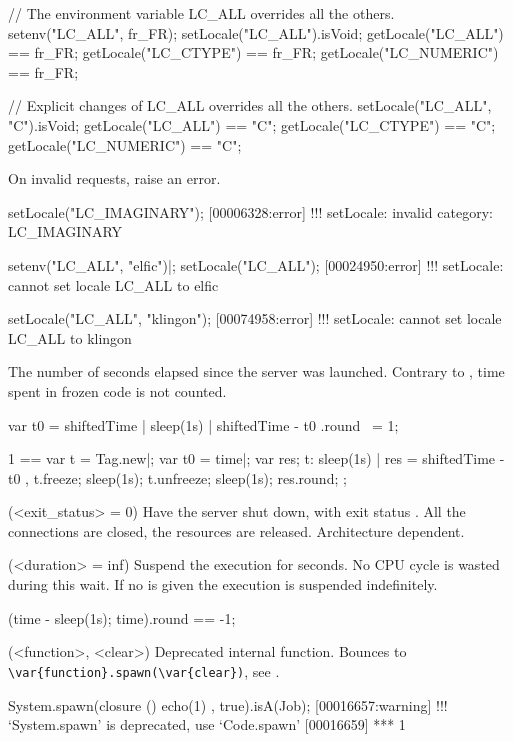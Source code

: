 \begin{urbiscriptapi}
\begin{urbiassert}
// The environment variable LC_ALL overrides all the others.
setenv("LC_ALL", fr_FR);
setLocale("LC_ALL").isVoid;
getLocale("LC_ALL")     == fr_FR;
getLocale("LC_CTYPE")   == fr_FR;
getLocale("LC_NUMERIC") == fr_FR;

// Explicit changes of LC_ALL overrides all the others.
setLocale("LC_ALL", "C").isVoid;
getLocale("LC_ALL")     == "C";
getLocale("LC_CTYPE")   == "C";
getLocale("LC_NUMERIC") == "C";
\end{urbiassert}

  On invalid requests, raise an error.
\begin{urbiscript}
setLocale("LC_IMAGINARY");
[00006328:error] !!! setLocale: invalid category: LC_IMAGINARY

setenv("LC_ALL", "elfic")|;
setLocale("LC_ALL");
[00024950:error] !!! setLocale: cannot set locale LC_ALL to elfic

setLocale("LC_ALL", "klingon");
[00074958:error] !!! setLocale: cannot set locale LC_ALL to klingon
\end{urbiscript}


\item[shiftedTime] The number of seconds elapsed since the \urbi server was
  launched.  Contrary to , time spent in frozen code is not
  counted.
\begin{urbiassert}
{ var t0 = shiftedTime | sleep(1s) | shiftedTime - t0 }.round ~= 1;

  1 ==
  {
    var t = Tag.new|;
    var t0 = time|;
    var res;
    t: { sleep(1s) | res = shiftedTime - t0 },
    t.freeze;
    sleep(1s);
    t.unfreeze;
    sleep(1s);
    res.round;
  };
\end{urbiassert}


\item[shutdown](<exit_status> = 0)%
  Have the \urbi server shut down, with exit status .  All
  the connections are closed, the resources are released.  Architecture
  dependent.


\item[sleep](<duration> = inf)%
  Suspend the execution for  seconds.  No CPU cycle is wasted
  during this wait. If no  is given the execution is suspended
  indefinitely.

\begin{urbiassert}
(time - {sleep(1s); time}).round == -1;
\end{urbiassert}


\item[spawn](<function>, <clear>)%
  Deprecated internal function.  Bounces to
  \lstinline|\var{function}.spawn(\var{clear})|, see .
\begin{urbiassert}
System.spawn(closure () { echo(1) }, true).isA(Job);
[00016657:warning] !!! `System.spawn' is deprecated, use `Code.spawn'
[00016659] *** 1
\end{urbiassert}



\end{urbiscriptapi}
